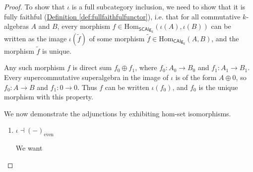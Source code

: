 \documentclass[a4paper]{report}
\newcommand{\Hom}{\mathrm{Hom}}
\theoremstyle{definition}
\theoremstyle{plain}
\theoremstyle{remark}
\begin{document}
\begin{proof}
  To show that $\iota$ is a full subcategory inclusion, we need to show that it is fully faithful (\hyperref[def:fullfaithfulfunctor]{Definition \ref*{def:fullfaithfulfunctor}}), i.e. that for all commutative $k$-algebras $A$ and $B$, every morphism $f\in \Hom_{\mathsf{SCAlg}_{k}}(\iota(A), \iota(B))$ can be written as the image $\iota(\tilde{f})$ of some morphism $\tilde{f} \in \Hom_{\mathsf{CAlg}_{k}}(A, B)$, and the morphism $\tilde{f}$ is unique.

  Any such morphism $f$ is direct sum $f_{0} \oplus f_{1}$, where $f_{0}\colon A_{0} \to B_{0}$ and $f_{1}\colon A_{1} \to B_{1}$. Every supercommutative superalgebra in the image of $\iota$ is of the form $A \oplus 0$, so $f_{0}\colon A \to B$ and $f_{1}\colon 0 \to 0$. Thus $f$ can be written $\iota(f_{0})$, and $f_{0}$ is the unique morphism with this property.

  We now demonstrate the adjunctions by exhibiting hom-set isomorphisms.
  \begin{enumerate}
    \item $\iota \dashv (-)_{\text{even}}$ 

      We want 
  \end{enumerate}
\end{proof}
\end{document}
